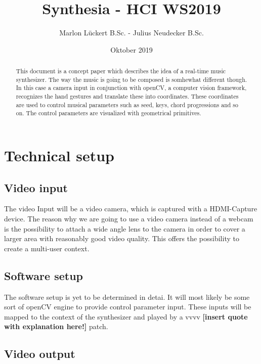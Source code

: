 \documentclass[titlepage, a4paper, 11pt]{scrartcl}
\begin{document}
\title{Synthesia - HCI WS2019}
\author{Marlon Lückert B.Sc. - Julius Neudecker B.Sc.}
\date{Oktober 2019}
\maketitle

\begin{abstract}
This document is a concept paper which describes the idea of a real-time music synthesizer. The way the music is going to be composed is somhewhat different though.
In this case a camera input in conjunction with openCV, a computer vision framework, recognizes the hand gestures and translate these into coordinates.
These coordinates are used to control musical parameters such as seed, keys, chord progressions and so on. The control parameters are visualized with geometrical primitives.
\end{abstract}

\tableofcontents

\pagebreak

\section{Technical setup}

\subsection{Video input} \label{videoinput}

The video Input will be a video camera, which is captured with a HDMI-Capture device. The reason why we are going to use a video camera instead of a webcam is the possibility
to attach a wide angle lens to the camera in order to cover a larger area with reasonably good video quality. This offers the possibility to create a multi-user context.
    

\subsection{Software setup}

The software setup is yet to be determined in detai. It will most likely be some sort of openCV engine to provide 
control parameter input. These inputs will be mapped to the context of the synthesizer and played by a vvvv \textbf{[insert quote with explanation here!]} patch.

\subsection{Video output}
\end{document}
